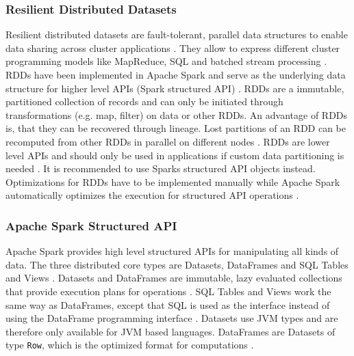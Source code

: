 \subsubsection{Resilient Distributed Datasets}
Resilient distributed datasets are fault-tolerant, parallel data structures to enable data sharing across cluster applications \cite{Zaharia2012RDDs}. They allow to express different cluster programming models like MapReduce, SQL and batched stream processing \cite{Zaharia2012RDDs}. RDDs have been implemented in Apache Spark and serve as the underlying data structure for higher level APIs (Spark structured API) \cite{Zaharia2012RDDs}.
RDDs are a immutable, partitioned collection of records and can only be initiated through transformations (e.g. map, filter) on data or other RDDs.
An advantage of RDDs is, that they can be recovered through lineage. Lost partitions of an RDD can be recomputed from other RDDs in parallel on different nodes \cite{Zaharia2012RDDs}. 
RDDs are lower level APIs and should only be used in applications if custom data partitioning is needed \cite{Chambers2018Spark}. It is recommended to use Sparks structured API objects instead. Optimizations for RDDs have to be implemented manually while Apache Spark automatically optimizes the execution for structured API operations \cite{Chambers2018Spark}.


\subsubsection{Apache Spark Structured API}
Apache Spark provides high level structured APIs for manipulating all kinds of data. The three distributed core types are Datasets, DataFrames and SQL Tables and Views \cite{Chambers2018Spark}.
Datasets and DataFrames are immutable, lazy evaluated collections that provide execution plans for operations \cite{Chambers2018Spark}. SQL Tables and Views work the same way as DataFrames, except that SQL is used as the interface instead of using the DataFrame programming interface \cite{Chambers2018Spark}.
Datasets use JVM types and are therefore only available for JVM based languages. DataFrames are Datasets of type \texttt{Row}, which is the optimized format for computations \cite{Chambers2018Spark}.


